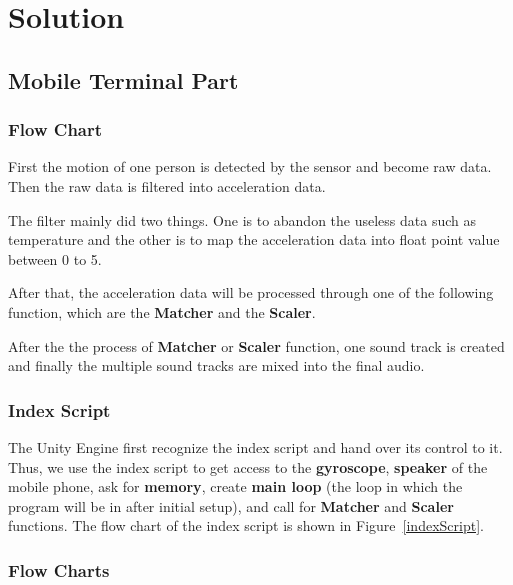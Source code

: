 \section{Solution}

\subsection{Mobile Terminal Part}

\subsubsection{Flow Chart}

   First the motion of one person is detected by the sensor and become raw data.
   Then the raw data is filtered into acceleration data. 

   The filter mainly did two things.
   One is to abandon the useless data such as temperature and the other is to
   map the acceleration data into float point value between 0 to 5. 

   After that, the acceleration data will be processed through one of the
   following function, which are the \textbf{Matcher} and the \textbf{Scaler}. 

   After the the process of \textbf{Matcher} or \textbf{Scaler} function, one
   sound track is created and finally the multiple sound tracks are mixed into
   the final audio. 

\subsubsection{Index Script}

The Unity Engine first recognize the index script and hand over its control to
it.  
Thus, we use the index script to get access to the 
\textbf{gyroscope}, \textbf{speaker} of the mobile phone, 
 ask for \textbf{memory}, create \textbf{main loop} (the loop in which the
 program will be in after initial setup), and call for 
\textbf{Matcher} and \textbf{Scaler} functions. 
The flow chart of the index script is shown in Figure~\ref{indexScript}.


\newpage
\subsubsection{Flow Charts}

